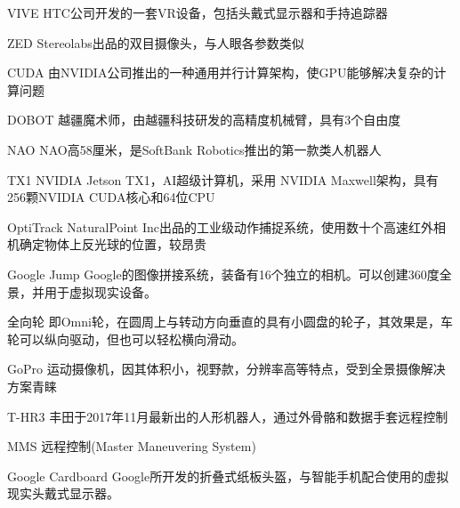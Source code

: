 \begin{denotation}[3cm]
\item[VIVE] HTC公司开发的一套VR设备，包括头戴式显示器和手持追踪器
\item[ZED] Stereolabs出品的双目摄像头，与人眼各参数类似
\item[CUDA] 由NVIDIA公司推出的一种通用并行计算架构，使GPU能够解决复杂的计算问题
\item[DOBOT] 越疆魔术师，由越疆科技研发的高精度机械臂，具有3个自由度
\item[NAO] NAO高58厘米，是SoftBank Robotics推出的第一款类人机器人
\item[TX1]  NVIDIA Jetson TX1，AI超级计算机，采用 NVIDIA Maxwell架构，具有256颗NVIDIA CUDA核心和64位CPU
\item[OptiTrack]  NaturalPoint Inc出品的工业级动作捕捉系统，使用数十个高速红外相机确定物体上反光球的位置，较昂贵
\item[Google Jump] Google的图像拼接系统，装备有16个独立的相机。可以创建360度全景，并用于虚拟现实设备。
\item[全向轮] 即Omni轮，在圆周上与转动方向垂直的具有小圆盘的轮子，其效果是，车轮可以纵向驱动，但也可以轻松横向滑动。
\item[GoPro] 运动摄像机，因其体积小，视野款，分辨率高等特点，受到全景摄像解决方案青睐
\item[T-HR3]丰田于2017年11月最新出的人形机器人，通过外骨骼和数据手套远程控制
\item[MMS]远程控制(Master Maneuvering System)
\item[Google Cardboard] Google所开发的折叠式纸板头盔，与智能手机配合使用的虚拟现实头戴式显示器。
\item[]
\item[]
\item[]
\item[]



\end{denotation}
